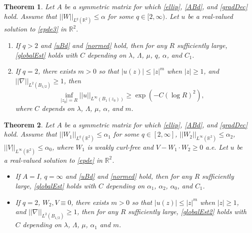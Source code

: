 \documentclass[12pt,reqno]{amsart}
\theoremstyle{plain}
\newtheorem{thm}{Theorem}
\theoremstyle{definition}
\newcommand{\al}{\alpha}
\newcommand{\la}{\lambda}
\newcommand{\La}{\Lambda}
\newcommand{\iny}{\infty}
\newcommand{\gr}{\nabla}
\newcommand{\norm}[1]{\left\vert \left\vert #1\right\vert\right\vert}
\newcommand{\abs}[1]{\left\vert#1\right\vert}
\newcommand{\brac}[1]{\left[#1\right]}
\newcommand{\pr}[1]{\left( #1 \right) }
\newcommand{\R}{\ensuremath{\mathbb{R}}}
\begin{document}
\begin{thm}
\label{LandisThm2}
Let $A$ be a symmetric matrix for which \eqref{ellip}, \eqref{ABd}, and \eqref{gradDec} hold.
Assume that $\norm{W}_{L^{q}\pr{\R^2}} \le \al$ for some $q \in [2, \iny)$.
Let $u$ be a real-valued solution to \eqref{epde3} in $\R^2$.
\begin{enumerate}
\item[{\rm (a)}] If $q > 2$ and \eqref{uBd} and \eqref{normed} hold, then for any $R$ sufficiently large, \eqref{globalEst} holds with $C$ depending on $\la$, $\La$, $\mu$, $q$, $\al$, and $C_1$.
\item[{\rm (b)}] If $q = 2$, there exists $m > 0$ so that $\abs{u\pr{z}} \le \abs{z}^m$ when $\abs{z} \ge 1$, and $\norm{\gr}_{L^2\pr{B_{1/2}}} \ge 1$, then
\begin{equation}
\inf_{\abs{z_0} = R} \norm{u}_{L^\iny\pr{B_1\pr{z_0}}} \ge \exp\pr{- C \pr{\log R}^2},
\label{globalEst2}
\end{equation}
where $C$ depends on $\la$, $\La$, $\mu$, $\al$, and $m$.
\end{enumerate}
\end{thm}

\begin{thm}
\label{LandisThm3}
Let $A$ be a symmetric matrix for which \eqref{ellip}, \eqref{ABd}, and \eqref{gradDec} hold.
Assume that $\norm{W_1}_{L^{q}\pr{\R^2}} \le \al_1$ for some $q \in \brac{2, \iny}$, $\norm{W_2}_{L^{\iny}\pr{\R^2}} \le \al_2$, $\norm{V}_{L^{\iny}\pr{\R^2}} \le \al_0$, where $W_1$ is weakly curl-free and $V - W_1 \cdot W_2 \ge 0$ a.e.
Let $u$ be a real-valued solution to \eqref{epde} in $\R^2$.
\begin{itemize}
\item[(a)] If $A = I$, $q = \iny$ and \eqref{uBd} and \eqref{normed} hold, then for any $R$ sufficiently large, \eqref{globalEst} holds with $C$ depending on $\al_1$, $\al_2$, $\al_0$, and $C_1$.
\item[(b)] If $q = 2$, $W_2, V \equiv 0$, there exists $m > 0$ so that $\abs{u\pr{z}} \le \abs{z}^m$ when $\abs{z} \ge 1$, and $\norm{\gr}_{L^2\pr{B_{1/2}}} \ge 1$, then for any $R$ sufficiently large, \eqref{globalEst2} holds with $C$ depending on $\la$, $\La$, $\mu$, $\al_1$ and $m$.
\end{itemize}
\end{thm}
\end{document}
